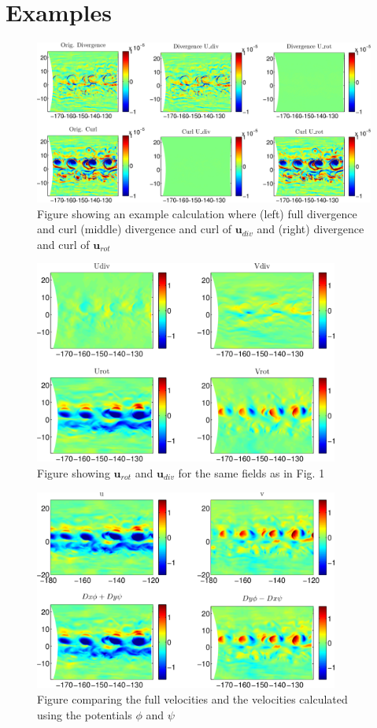 \documentclass{article}
\begin{document}
\section{Examples}
\begin{figure}[h!]
\noindent\includegraphics[width=16cm]{CorrectDivCurl.png}
\caption{Figure showing an example calculation where (left) full
  divergence and curl (middle) divergence and curl of $\bm{u}_{div}$ and
(right) divergence and curl of $\bm{u}_{rot}$}
\label{EqSlice}
\end{figure}
\begin{figure}[h!]
\noindent\includegraphics[width=10cm]{CorrectDivRotVel.png}
\caption{Figure showing $\bm{u}_{rot}$ and $\bm{u}_{div}$ for the same
  fields as in Fig. 1}
\label{EqSlice}
\end{figure}
\begin{figure}[h!]
\noindent\includegraphics[width=10cm]{CorrectVel.png}
\caption{Figure comparing the full velocities and the velocities
  calculated using the potentials $\phi$ and $\psi$}
\label{EqSlice}
\end{figure}
\end{document}
